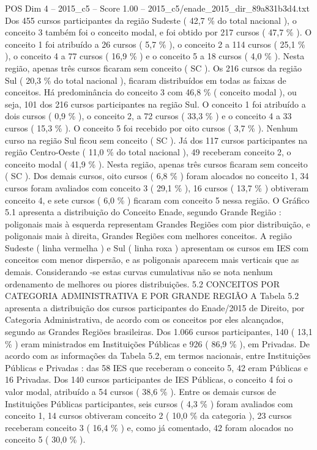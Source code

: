 \begin{textsample}{POS Dim 4 – 2015\_c5 – Score 1.00 – 2015\_c5/enade\_2015\_dir\_89a831b3d4.txt}
Dos 455 cursos participantes da região Sudeste ( 42,7 \% do total nacional ), o conceito 3 também foi o conceito modal, e foi obtido por 217 cursos ( 47,7 \% ).
O conceito 1 foi atribuído a 26 cursos ( 5,7 \% ), o conceito 2 a 114 cursos ( 25,1 \% ), o conceito 4 a 77 cursos ( 16,9 \% ) e o conceito 5 a 18 cursos ( 4,0 \% ).
Nesta região, apenas três cursos ficaram sem conceito ( SC ).
Os 216 cursos da região Sul ( 20,3 \% do total nacional ), ficaram distribuídos em todas as faixas de conceitos.
Há predominância do conceito 3 com 46,8 \% ( conceito modal ), ou seja, 101 dos 216 cursos participantes na região Sul.
O conceito 1 foi atribuído a dois cursos ( 0,9 \% ), o conceito 2, a 72 cursos ( 33,3 \% ) e o conceito 4 a 33 cursos ( 15,3 \% ).
O conceito 5 foi recebido por oito cursos ( 3,7 \% ).
Nenhum curso na região Sul ficou sem conceito ( SC ).
Já dos 117 cursos participantes na região Centro-Oeste ( 11,0 \% do total nacional ), 49 receberam conceito 2, o conceito modal ( 41,9 \% ).
Nesta região, apenas três cursos ficaram sem conceito ( SC ).
Dos demais cursos, oito cursos ( 6,8 \% ) foram alocados no conceito 1, 34 cursos foram avaliados com conceito 3 ( 29,1 \% ), 16 cursos ( 13,7 \% ) obtiveram conceito 4, e sete cursos ( 6,0 \% ) ficaram com conceito 5 nessa região.
O Gráfico 5.1 apresenta a distribuição do Conceito Enade, segundo Grande Região : poligonais mais à esquerda representam Grandes Regiões com pior distribuição, e poligonais mais à direita, Grandes Regiões com melhores conceitos.
A região Sudeste ( linha vermelha ) e Sul ( linha roxa ) apresentam os cursos em IES com conceitos com menor dispersão, e as poligonais aparecem mais verticais que as demais.
Considerando -se estas curvas cumulativas não se nota nenhum ordenamento de melhores ou piores distribuições. 5.2 CONCEITOS POR CATEGORIA ADMINISTRATIVA E POR GRANDE REGIÃO A Tabela 5.2 apresenta a distribuição dos cursos participantes do Enade/2015 de Direito, por Categoria Administrativa, de acordo com os conceitos por eles alcançados, segundo as Grandes Regiões brasileiras.
Dos 1.066 cursos participantes, 140 ( 13,1 \% ) eram ministrados em Instituições Públicas e 926 ( 86,9 \% ), em Privadas.
De acordo com as informações da Tabela 5.2, em termos nacionais, entre Instituições Públicas e Privadas : das 58 IES que receberam o conceito 5, 42 eram Públicas e 16 Privadas.
Dos 140 cursos participantes de IES Públicas, o conceito 4 foi o valor modal, atribuído a 54 cursos ( 38,6 \% ).
Entre os demais cursos de Instituições Públicas participantes, seis cursos ( 4,3 \% ) foram avaliados com conceito 1, 14 cursos obtiveram conceito 2 ( 10,0 \% da categoria ), 23 cursos receberam conceito 3 ( 16,4 \% ) e, como já comentado, 42 foram alocados no conceito 5 ( 30,0 \% ).

\end{textsample}
